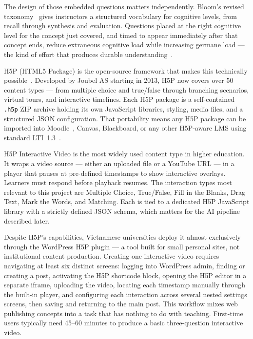 The design of those embedded questions matters independently. Bloom's revised taxonomy~\cite{anderson2001} gives instructors a structured vocabulary for cognitive levels, from recall through synthesis and evaluation. Questions placed at the right cognitive level for the concept just covered, and timed to appear immediately after that concept ends, reduce extraneous cognitive load while increasing germane load --- the kind of effort that produces durable understanding~\cite{sweller1988,chandler1991,paas2003}.

H5P (HTML5 Package) is the open-source framework that makes this technically possible~\cite{h5p2023,lumieducation2023}. Developed by Joubel AS starting in 2013, H5P now covers over 50 content types --- from multiple choice and true/false through branching scenarios, virtual tours, and interactive timelines. Each H5P package is a self-contained \texttt{.h5p} ZIP archive holding its own JavaScript libraries, styling, media files, and a structured JSON configuration. That portability means any H5P package can be imported into Moodle~\cite{moodle2023}, Canvas, Blackboard, or any other H5P-aware LMS using standard LTI~1.3~\cite{lti2019}.

H5P Interactive Video is the most widely used content type in higher education. It wraps a video source --- either an uploaded file or a YouTube URL --- in a player that pauses at pre-defined timestamps to show interactive overlays. Learners must respond before playback resumes. The interaction types most relevant to this project are Multiple Choice, True/False, Fill in the Blanks, Drag Text, Mark the Words, and Matching. Each is tied to a dedicated H5P JavaScript library with a strictly defined JSON schema, which matters for the AI pipeline described later.

Despite H5P's capabilities, Vietnamese universities deploy it almost exclusively through the WordPress H5P plugin --- a tool built for small personal sites, not institutional content production. Creating one interactive video requires navigating at least six distinct screens: logging into WordPress admin, finding or creating a post, activating the H5P shortcode block, opening the H5P editor in a separate iframe, uploading the video, locating each timestamp manually through the built-in player, and configuring each interaction across several nested settings screens, then saving and returning to the main post. This workflow mixes web publishing concepts into a task that has nothing to do with teaching. First-time users typically need 45--60 minutes to produce a basic three-question interactive video.

